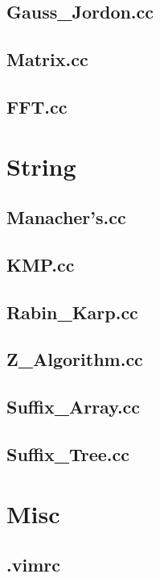 \subsection{Gauss\_Jordon.cc}

\subsection{Matrix.cc}

\subsection{FFT.cc}

\section{String}
\subsection{Manacher's.cc}

\subsection{KMP.cc}

\subsection{Rabin\_Karp.cc}

\subsection{Z\_Algorithm.cc}

\subsection{Suffix\_Array.cc}

\subsection{Suffix\_Tree.cc}

\section{Misc}
\subsection{.vimrc}

